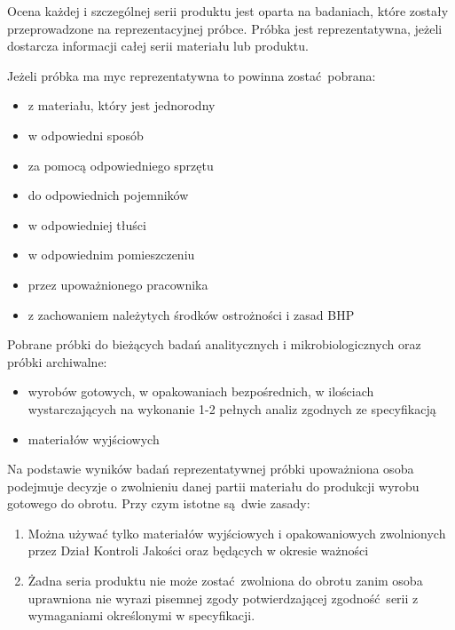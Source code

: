 Ocena każdej i szczególnej serii produktu jest oparta na badaniach, które zostały przeprowadzone na reprezentacyjnej próbce. Próbka jest reprezentatywna, jeżeli dostarcza informacji całej serii materiału lub produktu.\vspace{\baselineskip}

Jeżeli próbka ma myc reprezentatywna to powinna zostać pobrana:
\begin{itemize}
	\item z materiału, który jest jednorodny
	\item w odpowiedni sposób
	\item za pomocą odpowiedniego sprzętu
	\item do odpowiednich pojemników
	\item w odpowiedniej tłuści
	\item w odpowiednim pomieszczeniu
	\item przez upoważnionego pracownika
	\item z zachowaniem należytych środków ostrożności i zasad BHP
\end{itemize}\vspace{\baselineskip}

Pobrane próbki do bieżących badań analitycznych i mikrobiologicznych oraz próbki archiwalne:
\begin{itemize}
	\item wyrobów gotowych, w opakowaniach bezpośrednich, w ilościach wystarczających na wykonanie 1-2 pełnych analiz zgodnych ze specyfikacją
	\item materiałów wyjściowych
\end{itemize}\vspace{\baselineskip}

Na podstawie wyników badań reprezentatywnej próbki upoważniona osoba podejmuje decyzje o zwolnieniu danej partii materiału do produkcji wyrobu gotowego do obrotu. Przy czym istotne są dwie zasady:
\begin{enumerate}
	\item Można używać tylko materiałów wyjściowych i opakowaniowych zwolnionych przez Dział Kontroli Jakości oraz będących w okresie ważności
	\item Żadna seria produktu nie może zostać zwolniona do obrotu zanim osoba uprawniona nie wyrazi pisemnej zgody potwierdzającej zgodność serii z wymaganiami określonymi w specyfikacji.
\end{enumerate}\vspace{\baselineskip}

